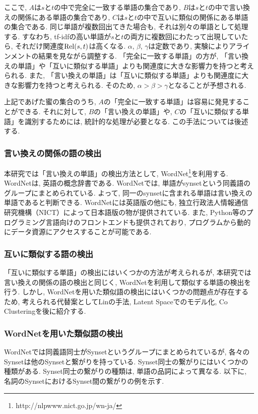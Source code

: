 \documentclass[12pt]{jarticle}
\begin{document}
ここで, $A$は$s$と$t$の中で完全に一致する単語の集合であり, $B$は$s$と$t$の中で言い換えの関係にある単語の集合であり, $C$は$s$と$t$の中で互いに類似の関係にある単語の集合である. 同じ単語が複数回出てきた場合も, それは別々の単語として処理する. すなわち, tf-idfの高い単語が$s$と$t$の両方に複数回にわたって出現していたら, それだけ関連度${\rm Rel}(s, t)$は高くなる. $\alpha$, $\beta$, $\gamma$は定数であり, 実験によりアラインメントの結果を見ながら調整する. 「完全に一致する単語」の方が, 「言い換えの単語」や「互いに類似する単語」よりも関連度に大きな影響力を持つと考えられる. また, 「言い換えの単語」は「互いに類似する単語」よりも関連度に大きな影響力を持つと考えられる. そのため, $\alpha > \beta > \gamma$となることが予想される.

上記であげた蜜の集合のうち, $A$の「完全に一致する単語」は容易に発見することができる. それに対して, $B$の「言い換えの単語」や, $C$の「互いに類似する単語」を識別するためには, 統計的な処理が必要となる. この手法については後述する.

\subsubsection{言い換えの関係の語の検出}
本研究では「言い換えの単語」の検出方法として, WordNet\footnote{http://nlpwww.nict.go.jp/wn-ja/}を利用する. WordNetは, 英語の概念辞書である. WordNetでは, 単語がsynsetという同義語のグループにまとめられている. よって, 同一のsynsetに含まれる単語は言い換えの単語であると判断できる. WordNetには英語版の他にも, 独立行政法人情報通信研究機構（NICT）によって日本語版の物が提供されている. また, Python等のプログラミング言語向けのフロントエンドも提供されており, プログラムから動的にデータ資源にアクセスすることが可能である.

\subsubsection{互いに類似する語の検出}
「互いに類似する単語」の検出にはいくつかの方法が考えられるが, 本研究では言い換えの関係の語の検出と同じく, WordNetを利用して類似する単語の検出を行う. しかし, WordNetを用いた類似語の検出にはいくつかの問題点が存在するため, 考えられる代替案としてLinの手法\cite{DekangLin}, Latent Spaceでのモデル化\cite{LatentSpace}, Co Clustering\cite{CoClustering}を後に紹介する.

\clearpage
\subsubsection{WordNetを用いた類似語の検出}
WordNetでは同義語同士がSynsetというグループにまとめられているが, 各々のSynsetは他のSynsetと繋がりを持っている. Synset同士の繋がりにはいくつかの種類がある. Synset同士の繋がりの種類は, 単語の品詞によって異なる. 以下に, 名詞のSynsetにおけるSynset間の繋がりの例を示す.
\end{document}
